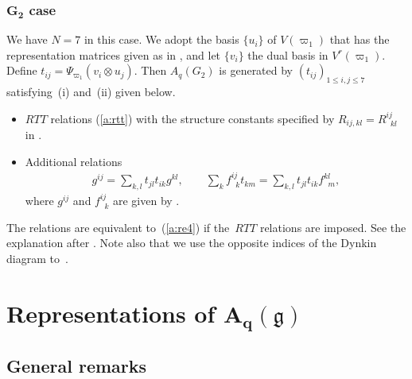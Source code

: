 \documentclass[11pt]{article}
\newcommand{\geh}{\mathfrak{g}}
\begin{document}
\subsubsection[$G_2$ case]{$\boldsymbol{G_2}$ case}\label{a:sss:g1}

We have $N=7$ in this case. We adopt the basis $\{u_i\}$ of $V(\varpi_1)$ that has the
representation matrices given as in \cite[equation~(29)]{Sasaki}, and let $\{v_i\}$ the dual basis
in $V^r(\varpi_1)$. Def\/ine $t_{ij}=\Psi_{\varpi_1}(v_i \otimes u_j)$. Then
$A_q(G_2)$ is generated by $(t_{ij})_{1\le i,j \le 7}$ satisfying~(i) and~(ii) given below.
\begin{itemize}\itemsep=0pt
\item[(i)] $RTT$ relations (\ref{a:rtt})
with the structure constants specif\/ied by
$R_{ij,kl} = R^{ij}_{\;\;kl}$ in \cite[equation~(33)]{Sasaki}.
%
\item[(ii)] Additional relations
\begin{gather}\label{a:re4}
g^{ij} = \sum_{k,l}t_{jl}t_{ik}g^{kl},\qquad
\sum_k f^{ij}_{\;\;k} t_{km} = \sum_{k,l}t_{jl}t_{ik} f^{k l}_{\;\;m},
\end{gather}
where $g^{ij}$ and $f^{ij}_{\;\;k}$ are
given by \cite[equations~(30), (31)]{Sasaki}.
\end{itemize}
The relations \cite[equations~(20), (22)]{Sasaki} are
equivalent to~(\ref{a:re4})  if the~$RTT$ relations are imposed.
See the explanation after \cite[Def\/inition~7]{Sasaki}.
Note also that we use the opposite indices of the Dynkin diagram to~\cite{Sasaki}.



\section[Representations of $A_q(\geh)$]{Representations of $\boldsymbol{A_q(\geh)}$}\label{a:sec4}


\subsection{General remarks}\label{a:ss:gr}
\end{document}
